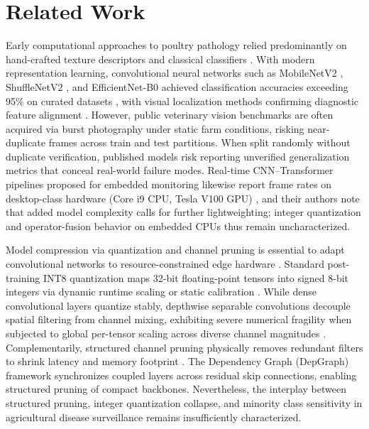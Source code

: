 \documentclass{jcse}
\begin{document}
\section{Related Work}
Early computational approaches to poultry pathology relied predominantly on hand-crafted texture descriptors and classical classifiers \cite{machuve2021poultry}. With modern representation learning, convolutional neural networks such as MobileNetV2 \cite{sandler2018mobilenetv2}, ShuffleNetV2 \cite{ma2018shufflenet}, and EfficientNet-B0 \cite{tan2019efficientnet} achieved classification accuracies exceeding 95\% on curated datasets \cite{dianyo2022fecal,almumtaz2026icaides}, with visual localization methods confirming diagnostic feature alignment \cite{selvaraju2017gradcam}. However, public veterinary vision benchmarks are often acquired via burst photography under static farm conditions, risking near-duplicate frames across train and test partitions. When split randomly without duplicate verification, published models risk reporting unverified generalization metrics that conceal real-world failure modes. Real-time CNN–Transformer pipelines proposed for embedded monitoring likewise report frame rates on desktop-class hardware (Core i9 CPU, Tesla V100 GPU) \cite{lei2026realtime}, and their authors note that added model complexity calls for further lightweighting; integer quantization and operator-fusion behavior on embedded CPUs thus remain uncharacterized.

Model compression via quantization and channel pruning is essential to adapt convolutional networks to resource-constrained edge hardware \cite{jacob2018quantization,wu2019tinyml}. Standard post-training INT8 quantization maps 32-bit floating-point tensors into signed 8-bit integers via dynamic runtime scaling or static calibration \cite{nagel2021whitepaper,gholami2022survey}. While dense convolutional layers quantize stably, depthwise separable convolutions decouple spatial filtering from channel mixing, exhibiting severe numerical fragility when subjected to global per-tensor scaling across diverse channel magnitudes \cite{krishnamoorthi2018quantizing,banner2019post,sheng2018quantization,yun2021smooth}. Complementarily, structured channel pruning physically removes redundant filters to shrink latency and memory footprint \cite{han2015deep,he2017channel,blalock2020state}. The Dependency Graph (DepGraph) framework \cite{fang2023depgraph} synchronizes coupled layers across residual skip connections, enabling structured pruning of compact backbones. Nevertheless, the interplay between structured pruning, integer quantization collapse, and minority class sensitivity in agricultural disease surveillance remains insufficiently characterized.
\end{document}
